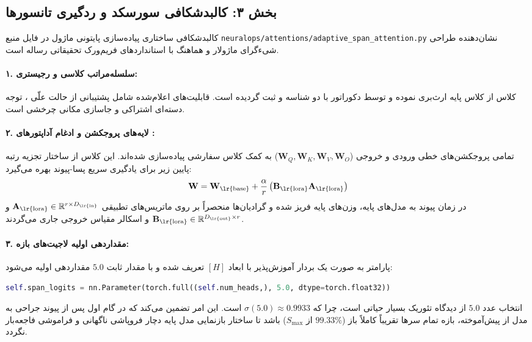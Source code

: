 \subsection*{بخش ۳: کالبدشکافی سورسکد و ردگیری تانسورها }
کالبدشکافی ساختاری پیاده‌سازی پایتونی ماژول در فایل منبع \nolinkurl{neuralops/attentions/adaptive_span_attention.py} نشان‌دهنده طراحی شیءگرای ماژولار و هماهنگ با استانداردهای فریم‌ورک تحقیقاتی رساله است.

\paragraph{۱. سلسله‌مراتب کلاسی و رجیستری:}
کلاس  از کلاس پایه  ارث‌بری نموده و توسط دکوراتور  با دو شناسه  و  ثبت گردیده است. قابلیت‌های اعلام‌شده شامل پشتیبانی از حالت علّی ، توجه دسته‌ای اشتراکی  و جاسازی مکانی چرخشی  است.

\paragraph{۲. لایه‌های پروجکشن و ادغام آداپتورهای :}
تمامی پروجکشن‌های خطی ورودی و خروجی ($\mathbf{W}_Q, \mathbf{W}_K, \mathbf{W}_V, \mathbf{W}_O$) به کمک کلاس سفارشی  پیاده‌سازی شده‌اند. این کلاس از ساختار تجزیه رتبه پایین زیر برای یادگیری سریع پسا-پیوند بهره می‌گیرد:
\begin{equation}
\mathbf{W} = \mathbf{W}_{\text{\lr{base}}} + \frac{\alpha}{r} \left(\mathbf{B}_{\text{\lr{lora}}} \mathbf{A}_{\text{\lr{lora}}}\right)
\end{equation}
در زمان پیوند به مدل‌های پایه، وزن‌های پایه فریز شده  و گرادیان‌ها منحصراً بر روی ماتریس‌های تطبیقی $\mathbf{A}_{\text{\lr{lora}}} \in \mathbb{R}^{r \times D_{\text{\lr{in}}}}$ و $\mathbf{B}_{\text{\lr{lora}}} \in \mathbb{R}^{D_{\text{\lr{out}}} \times r}$ و اسکالر مقیاس خروجی  جاری می‌گردند.

\paragraph{۳. مقداردهی اولیه لاجیت‌های بازه:}
پارامتر  به صورت یک بردار آموزش‌پذیر با ابعاد $[H]$ تعریف شده و با مقدار ثابت $5.0$ مقداردهی اولیه می‌شود:
\begin{lstlisting}[language=Python]
self.span_logits = nn.Parameter(torch.full((self.num_heads,), 5.0, dtype=torch.float32))
\end{lstlisting}
انتخاب عدد $5.0$ از دیدگاه تئوریک بسیار حیاتی است، چرا که $\sigma(5.0) \approx 0.9933$ است. این امر تضمین می‌کند که در گام اول پس از پیوند جراحی به مدل از پیش‌آموخته، بازه تمام سرها تقریباً کاملاً باز ($99.33\%$ از $S_{\max}$) باشد تا ساختار بازنمایی مدل پایه دچار فروپاشی ناگهانی و فراموشی فاجعه‌بار نگردد.

